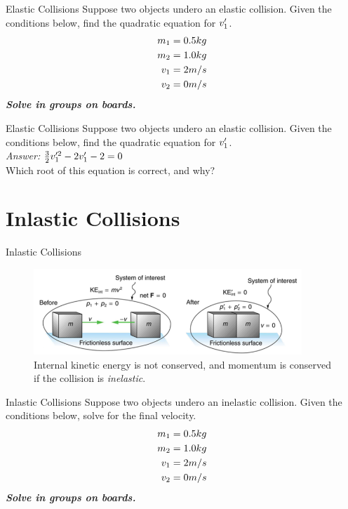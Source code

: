 \documentclass{beamer}
\begin{document}
\begin{frame}{Elastic Collisions}
Suppose two objects undero an elastic collision.  Given the conditions below, find the quadratic equation for $v_{\rm 1}'$.
\begin{align}
m_{\rm 1} &= 0.5 kg \\
m_{\rm 2} &= 1.0 kg \\
v_{\rm 1} &= 2 m/s \\
v_{\rm 2} &= 0 m/s
\end{align}
\textit{\textbf{Solve in groups on boards.}}
\end{frame}

\begin{frame}{Elastic Collisions}
Suppose two objects undero an elastic collision.  Given the conditions below, find the quadratic equation for $v_{\rm 1}'$. \\ \vspace{0.5cm}
\textit{Answer:} $\frac{3}{2}v_{\rm 1}'^2 - 2v_{\rm 1}' - 2 = 0$ \\
\vspace{0.5cm}
Which root of this equation is correct, and why?
\end{frame}

\section{Inlastic Collisions}

\begin{frame}{Inlastic Collisions}
\begin{figure}
\centering
\includegraphics[width=0.9\textwidth]{figures/inelastic.png}
\caption{\label{fig:inelastic} Internal kinetic energy is not conserved, and momentum is conserved if the collision is \textit{inelastic}.}
\end{figure}
\end{frame}

\begin{frame}{Inlastic Collisions}
Suppose two objects undero an inelastic collision.  Given the conditions below, solve for the final velocity.
\begin{align}
m_{\rm 1} &= 0.5 kg \\
m_{\rm 2} &= 1.0 kg \\
v_{\rm 1} &= 2 m/s \\
v_{\rm 2} &= 0 m/s
\end{align}
\textit{\textbf{Solve in groups on boards.}}
\end{frame}
\end{document}
